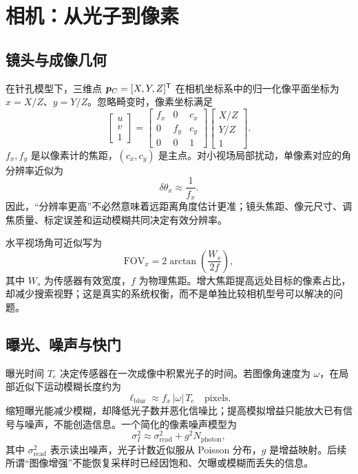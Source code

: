 \section{相机：从光子到像素}

\subsection{镜头与成像几何}

在针孔模型下，三维点 $\bm{p}_C=[X,Y,Z]^{\mathsf T}$ 在相机坐标系中的归一化像平面坐标为 $x=X/Z$、$y=Y/Z$。忽略畸变时，像素坐标满足
\begin{equation}
  \begin{bmatrix}u\\v\\1\end{bmatrix}
  =
  \begin{bmatrix}
    f_x & 0 & c_x\\
    0 & f_y & c_y\\
    0 & 0 & 1
  \end{bmatrix}
  \begin{bmatrix}X/Z\\Y/Z\\1\end{bmatrix}.
\end{equation}
$f_x,f_y$ 是以像素计的焦距，$(c_x,c_y)$ 是主点。对小视场局部扰动，单像素对应的角分辨率近似为
\begin{equation}
  \delta\theta_x \approx \frac{1}{f_x}.
\end{equation}
因此，“分辨率更高”不必然意味着远距离角度估计更准；镜头焦距、像元尺寸、调焦质量、标定误差和运动模糊共同决定有效分辨率。

水平视场角可近似写为
\begin{equation}
  \mathrm{FOV}_x = 2\arctan\!\left(\frac{W_s}{2f}\right),
\end{equation}
其中 $W_s$ 为传感器有效宽度，$f$ 为物理焦距。增大焦距提高远处目标的像素占比，却减少搜索视野；这是真实的系统权衡，而不是单独比较相机型号可以解决的问题。

\subsection{曝光、噪声与快门}

曝光时间 $T_e$ 决定传感器在一次成像中积累光子的时间。若图像角速度为 $\omega$，在局部近似下运动模糊长度约为
\begin{equation}
  \ell_{\mathrm{blur}} \approx f_x\,|\omega|\,T_e \quad \text{pixels}.
\end{equation}
缩短曝光能减少模糊，却降低光子数并恶化信噪比；提高模拟增益只能放大已有信号与噪声，不能创造信息。一个简化的像素噪声模型为
\begin{equation}
  \sigma_I^2 \approx \sigma_{\mathrm{read}}^2 + g^2 N_{\mathrm{photon}},
\end{equation}
其中 $\sigma_{\mathrm{read}}^2$ 表示读出噪声，光子计数近似服从 Poisson 分布，$g$ 是增益映射。后续所谓“图像增强”不能恢复采样时已经因饱和、欠曝或模糊而丢失的信息。


